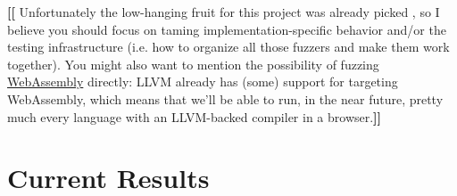 \documentclass[11pt]{article}
\newcommand{\Fix}[1]{\textbf{[[}{\color{red} #1}\textbf{]]}}
\newcommand{\Mar}[1]{\textbf{[[}{\color{blue} #1}\textbf{]]}}
\newcommand{\MAB}[1]{\textbf{[[}{\color{darkgreen} #1}\textbf{]]}}
\begin{document}

\MAB{Unfortunately the low-hanging fruit for this project was already
  picked \cite{patra2016learning}, so I believe you should focus on
  taming implementation-specific behavior and/or the testing
  infrastructure (i.e. how to organize all those fuzzers and make them
  work together). You might also want to mention the possibility of
  fuzzing
  \href{https://developer.mozilla.org/en-US/docs/WebAssembly}{WebAssembly}
  directly: LLVM already has (some) support for targeting WebAssembly,
  which means that we'll be able to run, in the near future, pretty
  much every language with an LLVM-backed compiler in a browser.}

\section{Current Results}
\label{sec:results}
\end{document}
